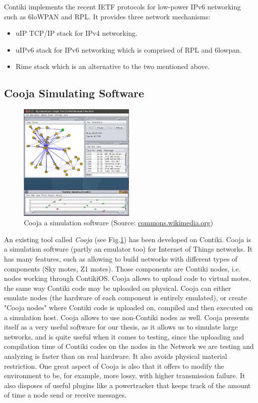 Contiki implements the recent IETF protocols for low-power IPv6 networking such as 6loWPAN and RPL. It provides three network mechanisms:
\begin{itemize}
\item uIP TCP/IP stack for IPv4 networking.
\item uIPv6 stack for IPv6 networking which is comprised of RPL and 6lowpan.
\item Rime stack which is an alternative to the two mentioned above.
\end{itemize}


\subsection*{Cooja Simulating Software}

\begin{figure}
  \centering
  \includegraphics[width=0.5\textwidth]{res/cooja.png}
  \caption{Cooja a simulation software (Source: \href{commons.wikimedia.org/wiki/File:Contiki-ipv6-rpl-cooja-simulation.png}{commons.wikimedia.org})}
  \label{fig:cooja}
\end{figure}

An existing tool called \textit{Cooja} (see Fig.\ref{fig:cooja}) has been developed on Contiki. Cooja is a simulation software (partly an emulator too) for Internet of Things networks. It has many features, such as allowing to build networks with different types of components (Sky motes, Z1 motes). Those components are Contiki nodes, i.e. nodes working through ContikiOS. Cooja allows to upload code to virtual motes, the same way Contiki code may be uploaded on physical. Cooja can either emulate nodes (the hardware of each component is entirely emulated), or create "Cooja nodes" where Contiki code is uploaded on, compiled and then executed on a simulation host. Cooja allows to use non-Contiki nodes as well. Cooja presents itself as a very useful software for our thesis, as it allows us to simulate large networks, and is quite useful when it comes to testing, since the uploading and compilation time of Contiki codes on the nodes in the Network we are testing and analyzing is faster than on real hardware. It also avoids physical material restriction. One great aspect of Cooja is also that it offers to modify the environment to be, for example, more lossy, with higher transmission failure. It also disposes of useful plugins like a powertracker that keeps track of the amount of time a node send or receive messages.\\

